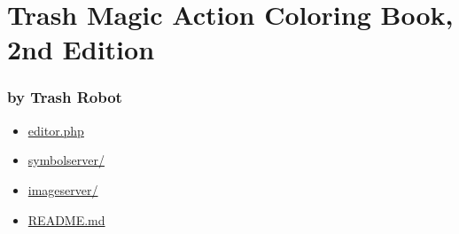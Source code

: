 \hypertarget{trash-magic-action-coloring-book-2nd-edition}{%
\section{Trash Magic Action Coloring Book, 2nd
Edition}\label{trash-magic-action-coloring-book-2nd-edition}}

\hypertarget{by-trash-robot}{%
\subsubsection{by Trash Robot}\label{by-trash-robot}}

\begin{itemize}
\tightlist
\item
  \url{editor.php}
\item
  \url{symbolserver/}
\item
  \url{imageserver/}
\item
  \href{scroll(README.md)}{README.md}
\end{itemize}
